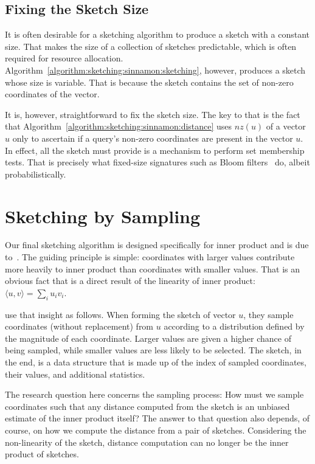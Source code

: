 \subsection{Fixing the Sketch Size}

It is often desirable for a sketching algorithm to produce a sketch with a constant size.
That makes the size of a collection of sketches predictable, which is often required
for resource allocation. Algorithm~\ref{algorithm:sketching:sinnamon:sketching},
however, produces a sketch whose size is variable. That is because the sketch contains
the set of non-zero coordinates of the vector.

It is, however, straightforward to fix the sketch size. The key to that is
the fact that Algorithm~\ref{algorithm:sketching:sinnamon:distance} uses
$\mathit{nz}(u)$ of a vector $u$ only to ascertain if a query's non-zero coordinates
are present in the vector $u$. In effect, all the sketch must provide is a mechanism
to perform set membership tests. That is precisely what fixed-size signatures such
as Bloom filters~\citep{bloom-filter} do, albeit probabilistically.

\section{Sketching by Sampling}

Our final sketching algorithm is designed specifically for inner product
and is due to~\cite{daliri2023sampling}. The guiding principle is simple:
coordinates with larger values contribute more heavily to inner product than
coordinates with smaller values. That is an obvious fact that is a direct result
of the linearity of inner product: $\langle u, v \rangle = \sum_i u_i v_i$.

\cite{daliri2023sampling} use that insight as follows.
When forming the sketch of vector $u$, they sample coordinates (without replacement)
from $u$ according to a distribution defined by the magnitude of each coordinate.
Larger values are given a higher chance of being sampled, while smaller values are
less likely to be selected. The sketch, in the end, is a data structure that
is made up of the index of sampled coordinates, their values, and additional statistics.

The research question here concerns the sampling process: How must we sample
coordinates such that any distance computed from the sketch is an unbiased estimate
of the inner product itself? The answer to that question also depends, of course, on how
we compute the distance from a pair of sketches. Considering the non-linearity of the sketch,
distance computation can no longer be the inner product of sketches.

